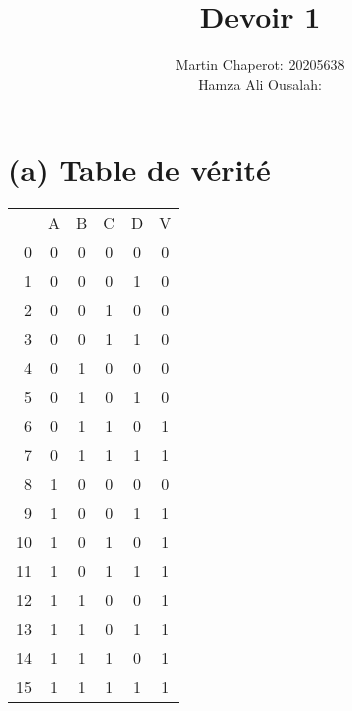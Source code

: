\documentclass{article}
\title{Devoir 1}
\author{Martin Chaperot: 20205638\\ Hamza Ali Ousalah: }
\date{}
\begin{document}
\maketitle

\section*{(a) Table de vérité}
\begin{tabular}{r|c|c|c|c||c|}
    \cline{2-6}
       & A & B & C & D & V \\
    \cline{2-6}
    0  & 0 & 0 & 0 & 0 & 0 \\
    1  & 0 & 0 & 0 & 1 & 0 \\
    2  & 0 & 0 & 1 & 0 & 0 \\
    3  & 0 & 0 & 1 & 1 & 0 \\
    4  & 0 & 1 & 0 & 0 & 0 \\
    5  & 0 & 1 & 0 & 1 & 0 \\
    6  & 0 & 1 & 1 & 0 & 1 \\
    7  & 0 & 1 & 1 & 1 & 1 \\
    8  & 1 & 0 & 0 & 0 & 0 \\
    9  & 1 & 0 & 0 & 1 & 1 \\
    10 & 1 & 0 & 1 & 0 & 1 \\
    11 & 1 & 0 & 1 & 1 & 1 \\
    12 & 1 & 1 & 0 & 0 & 1 \\
    13 & 1 & 1 & 0 & 1 & 1 \\
    14 & 1 & 1 & 1 & 0 & 1 \\
    15 & 1 & 1 & 1 & 1 & 1 \\
    \cline{2-6}
\end{tabular}
\end{document}
